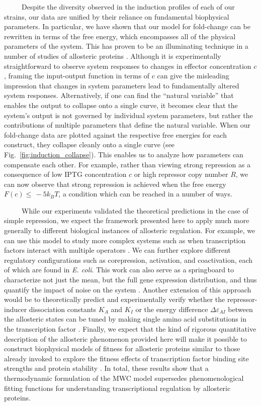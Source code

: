 \documentclass[12pt]{caltech_thesis}
\begin{document}
~~~~~Despite the diversity observed in the induction profiles of each of
our strains, our data are unified by their reliance on fundamental
biophysical parameters. In particular, we have shown that our model for
fold-change can be rewritten in terms of the free energy, which
encompasses all of the physical parameters of the system. This has
proven to be an illuminating technique in a number of studies of
allosteric proteins \autocite{sourjik2002b,keymer2006,swem2008}.
Although it is experimentally straightforward to observe system
responses to changes in effector concentration \(c\), framing the
input-output function in terms of \(c\) can give the misleading
impression that changes in system parameters lead to fundamentally
altered system responses. Alternatively, if one can find the ``natural
variable'' that enables the output to collapse onto a single curve, it
becomes clear that the system's output is not governed by individual
system parameters, but rather the contributions of multiple parameters
that define the natural variable. When our fold-change data are plotted
against the respective free energies for each construct, they collapse
cleanly onto a single curve (see Fig.~\ref{fig:induction_collapse}).
This enables us to analyze how parameters can compensate each other. For
example, rather than viewing strong repression as a consequence of low
IPTG concentration \(c\) or high repressor copy number \(R\), we can now
observe that strong repression is achieved when the free energy
\(F(c) \leq\, -5 k_BT\), a condition which can be reached in a number of
ways.

~~~~~While our experiments validated the theoretical predictions in the
case of simple repression, we expect the framework presented here to
apply much more generally to different biological instances of
allosteric regulation. For example, we can use this model to study more
complex systems such as when transcription factors interact with
multiple operators \autocite{bintu2005a}. We can further explore
different regulatory configurations such as corepression, activation,
and coactivation, each of which are found in \emph{E. coli}. This work
can also serve as a springboard to characterize not just the mean, but
the full gene expression distribution, and thus quantify the impact of
noise on the system \autocite{eldar2010b}. Another extension of this
approach would be to theoretically predict and experimentally verify
whether the repressor-inducer dissociation constants \(K_A\) and \(K_I\)
or the energy difference \(\Delta \varepsilon_{AI}\) between the
allosteric states can be tuned by making single amino acid substitutions
in the transcription factor \autocite{daber2009a,phillips2015}. Finally,
we expect that the kind of rigorous quantitative description of the
allosteric phenomenon provided here will make it possible to construct
biophysical models of fitness for allosteric proteins similar to those
already invoked to explore the fitness effects of transcription factor
binding site strengths and protein stability
\autocite{gerland2002,berg2004,zeldovich2008}. In total, these results
show that a thermodynamic formulation of the MWC model supersedes
phenomenological fitting functions for understanding transcriptional
regulation by allosteric proteins.
\end{document}

